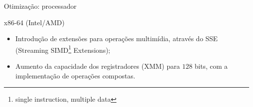 \documentclass[]{beamer}
\begin{document}
\begin{frame}{Otimização: processador}

  \begin{block}{x86-64 (Intel/AMD)}
    \begin{itemize}
    \item Introdução de extensões para operações multimídia, através do
      SSE (Streaming SIMD\footnote{single instruction, multiple data} Extensions);
    \item Aumento da capacidade dos registradores (XMM) para $128$
      bits, com a implementação de operações compostas.
    \end{itemize}
  \end{block}

\begin{center}
\end{center}

\end{frame}
\end{document}
